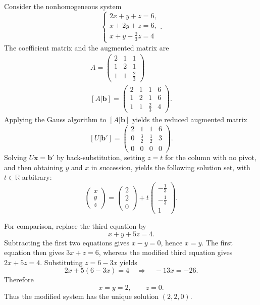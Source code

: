 \begin{example}
Consider the nonhomogeneous system
\[
\begin{cases}
2x + y + z = 6, \\
x + 2y + z = 6, \\
x + y + \tfrac{2}{3} z = 4
\end{cases}.
\]
The coefficient matrix and the augmented matrix are
\[
\begin{gathered}
A = \begin{pmatrix} 2 & 1 & 1 \\ 1 & 2 & 1 \\ 1 & 1 & \tfrac{2}{3} \end{pmatrix} \\
[A|\mathbf{b}] = \begin{pmatrix} 2 & 1 & 1 & 6 \\ 1 & 2 & 1 & 6 \\ 1 & 1 & \tfrac{2}{3} & 4 \end{pmatrix}.
\end{gathered}
\]
Applying the Gauss algorithm to $[A|\mathbf{b}]$ yields the reduced augmented matrix
\[
[U|\mathbf{b}'] = \begin{pmatrix} 2 & 1 & 1 & 6 \\ 0 & \tfrac{3}{2} & \tfrac{1}{2} & 3 \\ 0 & 0 & 0 & 0 \end{pmatrix}.
\]
Solving $U\mathbf{x} = \mathbf{b}'$ by back-substitution, setting $z = t$ for the column with no pivot, and then obtaining $y$ and $x$ in succession, yields the following solution set, with $t \in \mathbb{R}$ arbitrary:
\[
\begin{pmatrix} x \\ y \\ z \end{pmatrix} = \begin{pmatrix} 2 \\ 2 \\ 0 \end{pmatrix} + t \begin{pmatrix} -\tfrac{1}{3} \\ -\tfrac{1}{3} \\ 1 \end{pmatrix}.
\]

For comparison, replace the third equation by
\[
x+y+5z=4.
\] Subtracting
the first two equations gives $x-y=0$, hence $x=y$. The first equation
then gives $3x+z=6$, whereas the modified third equation gives
$2x+5z=4$. Substituting $z=6-3x$ yields
\[
2x+5(6-3x)=4
\quad\Longrightarrow\quad
-13x=-26.
\]
Therefore
\[
x=y=2,\qquad z=0.
\]
Thus the modified system has the unique solution $(2,2,0)$.
\end{example}

